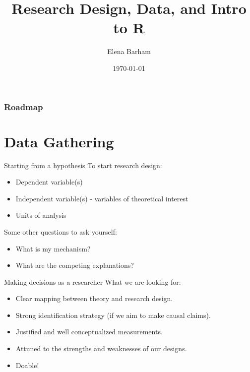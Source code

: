 \documentclass{beamer}
\title[Data and Design]{Research Design, Data, and Intro to R} %
\author[Barham]{Elena Barham} %
\institute[Columbia]
{Columbia University}
\date{\today}
\begin{document}
\begin{frame}
\titlepage %
\end{frame}



\begin{frame}
\frametitle{Roadmap}
\tableofcontents 
\end{frame} 
\section{Data Gathering}
\begin{frame}{Starting from a hypothesis}
To start research design:  
\begin{itemize} 
    \item Dependent variable(s)
    \item Independent variable(s) - variables of theoretical interest 
    \item Units of analysis 
\end{itemize}
\vspace{.5cm}
Some other questions to ask yourself:
\begin{itemize}
    \item What is my mechanism?
    \item What are the competing explanations? 
\end{itemize}
\end{frame} 

\begin{frame}{Making decisions as a researcher}
What we are looking for:
\begin{itemize}
    \item Clear mapping between theory and research design.   
    \item Strong identification strategy (if we aim to make causal claims).   
    \item Justified and well conceptualized measurements. 
    \item Attuned to the strengths and weaknesses of our designs. 
    \item Doable! 
\end{itemize}
\end{frame}
\end{document}
